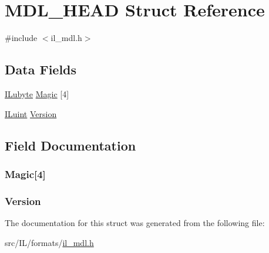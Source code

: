 \hypertarget{struct_m_d_l___h_e_a_d}{\section{M\-D\-L\-\_\-\-H\-E\-A\-D Struct Reference}
\label{struct_m_d_l___h_e_a_d}
}


{\ttfamily \#include $<$il\-\_\-mdl.\-h$>$}

\subsection*{Data Fields}
\begin{DoxyCompactItemize}
\item 
\hyperlink{il_8h_a8d2f04500100a86d1b00e98ab1b15a33}{I\-Lubyte} \hyperlink{struct_m_d_l___h_e_a_d_a9a93e0164b5953a5a22a74e80b3f6363}{Magic} \mbox{[}4\mbox{]}
\item 
\hyperlink{il_8h_ac6508d0e9c19e32f32e00d54b5b8cf30}{I\-Luint} \hyperlink{struct_m_d_l___h_e_a_d_ace8731875025335038f754ff027b835a}{Version}
\end{DoxyCompactItemize}


\subsection{Field Documentation}
\hypertarget{struct_m_d_l___h_e_a_d_a9a93e0164b5953a5a22a74e80b3f6363}{
\subsubsection[{Magic}]{ Magic\mbox{[}4\mbox{]}}}\label{struct_m_d_l___h_e_a_d_a9a93e0164b5953a5a22a74e80b3f6363}
\hypertarget{struct_m_d_l___h_e_a_d_ace8731875025335038f754ff027b835a}{
\subsubsection[{Version}]{ Version}}\label{struct_m_d_l___h_e_a_d_ace8731875025335038f754ff027b835a}


The documentation for this struct was generated from the following file\-:\begin{DoxyCompactItemize}
\item 
src/\-I\-L/formats/\hyperlink{il__mdl_8h}{il\-\_\-mdl.\-h}\end{DoxyCompactItemize}
